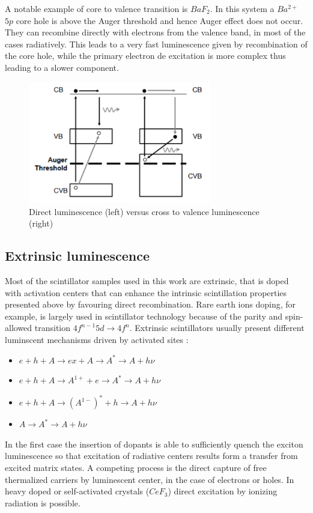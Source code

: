 A notable example of core to valence transition is $BaF_{2}$. In this system a $Ba^{2+}$ $5p$ core hole is above the Auger threshold and hence Auger effect does not occur. They can recombine directly with electrons from the valence band, in most of the cases radiatively.
This leads to a very fast luminescence given by recombination of the core hole, while the primary electron de excitation is more complex thus leading to a slower component.

\begin{figure}
\centering
\includegraphics[width=8cm]{../Pictures/Chapter_2/core_to_valence.pdf}
\caption[Core to valence luminescence]{Direct luminescence (left) versus cross to valence luminescence (right)}
\label{fig:CTV}
\end{figure}
 

\subsection{Extrinsic luminescence}

Most of the scintillator samples used in this work are extrinsic, that is doped with activation centers that can enhance the intrinsic scintillation properties presented above by favouring direct recombination.
Rare earth ions doping, for example, is largely used in scintillator technology because of the parity and spin-allowed transition $4f^{n-1}5d\rightarrow 4f^{n}$. 
Extrinsic scintillators usually present different luminscent mechanisms driven by activated sites \cite{Lecoq2006}:
\begin{itemize}
\item $e + h + A \rightarrow ex + A \rightarrow A^{*} \rightarrow A + h\nu$
\item $e + h + A \rightarrow A^{1+} + e \rightarrow A^{*} \rightarrow A + h\nu$
\item $e + h + A \rightarrow (A^{1-})^{*} + h \rightarrow A + h\nu$
\item $A \rightarrow A^{*} \rightarrow A + h\nu$
\end{itemize}
In the first case the insertion of dopants is able to sufficiently quench the exciton luminescence so that excitation of radiative centers results form a transfer from excited matrix states.
A competing process is the direct capture of free thermalized carriers by luminescent center, in the case of electrons or holes.
In heavy doped or self-activated crystals ($CeF_{3}$) direct excitation by ionizing radiation is possible.

